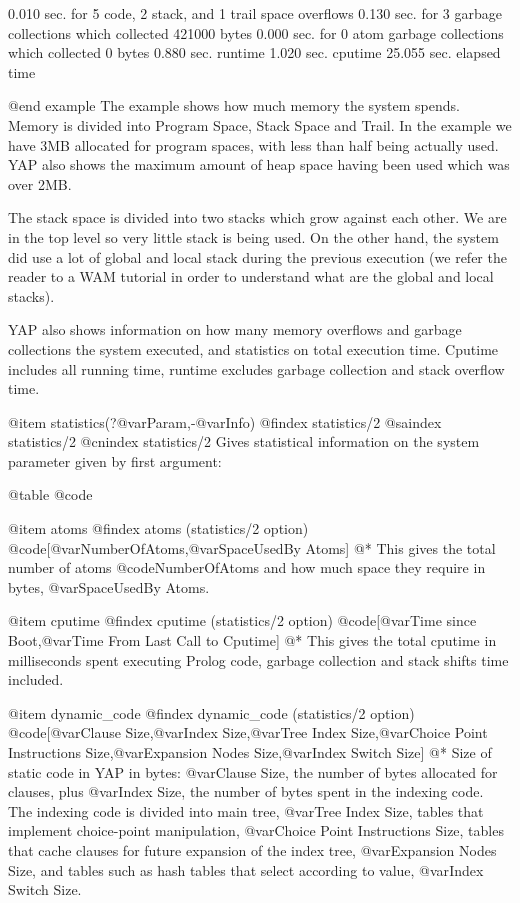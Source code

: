 {{{{{{{       0.010 sec. for 5 code, 2 stack, and 1 trail space overflows
       0.130 sec. for 3 garbage collections which collected 421000 bytes
       0.000 sec. for 0 atom garbage collections which collected 0 bytes
       0.880 sec. runtime
       1.020 sec. cputime
      25.055 sec. elapsed time

@end example
The example shows how much memory the system spends. Memory is divided
into Program Space, Stack Space and Trail. In the example we have 3MB
allocated for program spaces, with less than half being actually
used. YAP also shows the maximum amount of heap space having been used
which was over 2MB.

The stack space is divided into two stacks which grow against each
other. We are in the top level so very little stack is being used. On
the other hand, the system did use a lot of global and local stack
during the previous execution (we refer the reader to a WAM tutorial in
order to understand what are the global and local stacks).

YAP also shows information on how many memory overflows and garbage
collections the system executed, and statistics on total execution
time. Cputime includes all running time, runtime excludes garbage
collection and stack overflow time.

@item statistics(?@var{Param},-@var{Info})
@findex statistics/2
@saindex statistics/2
@cnindex statistics/2
Gives statistical information on the system parameter given by first
argument:

@table @code

@item atoms
@findex atoms (statistics/2 option)
@code{[@var{NumberOfAtoms},@var{SpaceUsedBy Atoms}]}
@* 
This gives the total number of atoms @code{NumberOfAtoms} and how much
space they require in bytes, @var{SpaceUsedBy Atoms}.

@item cputime
@findex cputime (statistics/2 option)
@code{[@var{Time since Boot},@var{Time From Last Call to Cputime}]}
@* 
This gives the total cputime in milliseconds spent executing Prolog code,
garbage collection and stack shifts time included.

@item dynamic_code
@findex dynamic_code (statistics/2 option)
@code{[@var{Clause Size},@var{Index Size},@var{Tree Index
Size},@var{Choice Point Instructions
Size},@var{Expansion Nodes Size},@var{Index Switch Size}]}
@*
Size of static code in YAP in bytes: @var{Clause Size}, the number of
bytes allocated for clauses, plus
@var{Index Size}, the number of bytes spent in the indexing code. The
indexing code is divided into main tree, @var{Tree Index
Size}, tables that implement choice-point manipulation, @var{Choice Point Instructions
Size}, tables that cache clauses for future expansion of the index
tree, @var{Expansion Nodes Size}, and 
tables such as hash tables that select according to value,  @var{Index Switch Size}.

}}}}}}}
